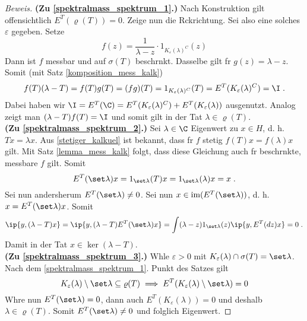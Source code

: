 		\begin{proof}[Beweis]
			\textbf{(Zu \ref{spektralmass_spektrum_1}.)} Nach Konstruktion gilt offensichtlich \(E^T(\varrho(T)) = 0\). Zeige nun die R\us ckrichtung. Sei also eine solches \(\varepsilon\) gegeben. Setze
			\[f(z) = \frac{1}{\lambda - z} \cdot1_{K_\varepsilon(\lambda)^C}(z)\]
			Dann ist $f$ messbar und auf \(\sigma(T)\) beschr\as nkt. Dasselbe gilt f\us r \(g(z) = \lambda - z\). Somit (mit Satz \ref{komposition_mess_kalk}) 
			\[f(T)(\lambda -T) = f(T)g(T) = (fg)(T) = 1_{K_\varepsilon(\lambda)^C}(T) = E^T(K_\varepsilon(\lambda)^C) = \I\;.\]
			Dabei haben wir \(\I = E^T(\C) = E^T(K_\varepsilon(\lambda)^C) + E^T(K_\varepsilon(\lambda))\) ausgenutzt. Analog zeigt man \((\lambda-T)f(T) = \I\) und somit gilt in der Tat \(\lambda \in \varrho(T)\).\\
			\textbf{(Zu \ref{spektralmass_spektrum_2}.)} Sei \(\lambda \in \C\) Eigenwert zu \(x\in H\), d. h. \(Tx = \lambda x\). Aus \ref{stetiger_kalkuel} ist bekannt, dass f\us r $f$ stetig \(f(T)x = f(\lambda)x\) gilt. Mit Satz \ref{lemma_mess_kalk} folgt, dass diese Gleichung auch f\us r beschr\as nkte, messbare $f$ gilt. Somit
			\[E^T(\set\lambda)x = 1_{\set\lambda}(T)x = 1_{\set\lambda}(\lambda)x = x\;.\]
			Sei nun andersherum \(E^T(\set\lambda)\neq 0\). Sei nun \(x\in \text{im}(E^T(\set\lambda))\), d. h. \(x = E^T(\set\lambda) x\). Somit
			\[\ip{y, (\lambda -T)x} = \ip{y, (\lambda-T)E^T(\set\lambda)x} = \int(\lambda-z)1_{\set\lambda}(z)\ip{y, E^T(dz)x} = 0\;.\]
			Damit in der Tat \(x\in \ker(\lambda - T)\).\\
			\textbf{(Zu \ref{spektralmass_spektrum_3}.)} W\as hle \(\varepsilon > 0\) mit \(K_\varepsilon(\lambda)\cap\sigma(T) = \set\lambda\). Nach dem \ref{spektralmass_spektrum_1}. Punkt des Satzes gilt \[K_\varepsilon(\lambda)\setminus\set\lambda\subseteq \varrho(T)\implies E^T(K_\varepsilon(\lambda)\setminus\set\lambda) = 0\]
			W\as hre nun \(E^T(\set\lambda) = 0\), dann auch \(E^T(K_\varepsilon(\lambda)) = 0\) und deshalb \(\lambda\in \varrho(T)\). Somit \(E^T(\set\lambda) \neq 0\) und folglich Eigenwert. 
		\end{proof}
	
